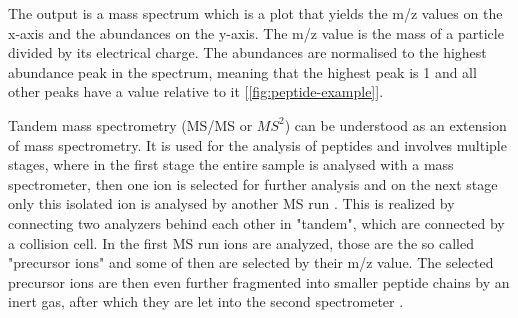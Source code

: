 \documentclass[11pt]{article}
\begin{document}
The output is a mass spectrum which is a plot that yields the m/z values on the x-axis and the abundances on the y-axis. The m/z value is the mass of a particle divided by its electrical charge. The abundances are normalised to the highest abundance peak in the spectrum, meaning that the highest peak is 1 and all other peaks have a value relative to it [\cref{fig:peptide-example}]. 

Tandem mass spectrometry (MS/MS or \(MS^2\)) can be understood as an extension of mass spectrometry. It is used for the analysis of peptides and involves multiple stages, where in the first stage the entire sample is analysed with a mass spectrometer, then one ion is selected for further analysis and on the next stage only this isolated ion is analysed by another MS run \cite{tandem-mass-spectrometry}. This is realized by connecting two analyzers behind each other in "tandem", which are connected by a collision cell. In the first MS run ions are analyzed, those are the so called "precursor ions" and some of then are selected by their m/z value. The selected precursor ions are then even further fragmented into smaller peptide chains by an inert gas, after which they are let into the second spectrometer \cite{tandem-mass-spec-deutsch, tandem-mass-spec-yt}.
\end{document}
